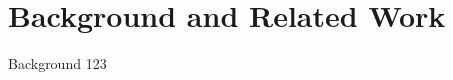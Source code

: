 \chapter{Background and Related Work}
\label{background}

Background 123


\renewcommand\thefigure{\thechapter .\arabic{figure}}
